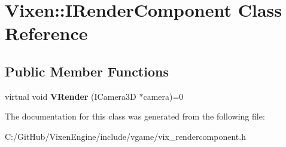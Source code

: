 \hypertarget{class_vixen_1_1_i_render_component}{}\section{Vixen\+:\+:I\+Render\+Component Class Reference}
\label{class_vixen_1_1_i_render_component}
\subsection*{Public Member Functions}
\begin{DoxyCompactItemize}
\item 
\hypertarget{class_vixen_1_1_i_render_component_a4c3728900746939748aadbe6e694e8b1}{}virtual void {\bfseries V\+Render} (I\+Camera3\+D $\ast$camera)=0\label{class_vixen_1_1_i_render_component_a4c3728900746939748aadbe6e694e8b1}

\end{DoxyCompactItemize}


The documentation for this class was generated from the following file\+:\begin{DoxyCompactItemize}
\item 
C\+:/\+Git\+Hub/\+Vixen\+Engine/include/vgame/vix\+\_\+rendercomponent.\+h\end{DoxyCompactItemize}

